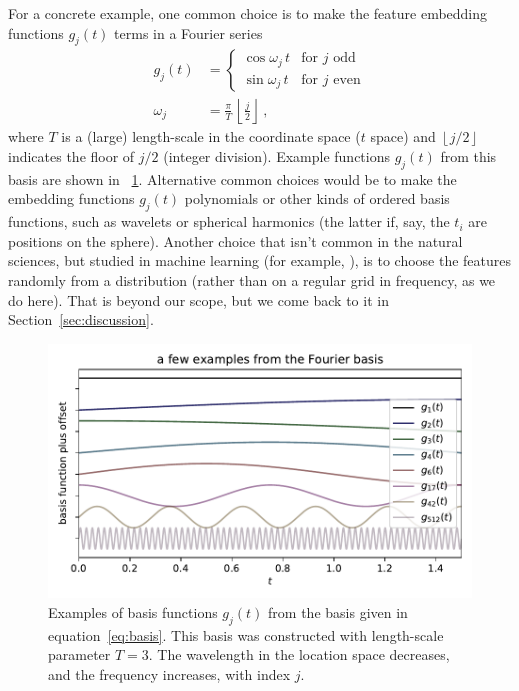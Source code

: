 \documentclass[12pt,letterpaper]{article}
\newlength{\figurewidth}
\newcommand{\floor}[1]{\left\lfloor #1 \right\rfloor}
\newcommand{\sectionname}{Section}
\begin{document}
For a concrete example, one common choice is to make the feature embedding functions $g_j(t)$ terms in a Fourier series
\begin{align}\label{eq:basis}
    g_j(t) &= \left\{\begin{array}{ll}
            \cos\omega_j\,t & \mbox{for $j$ odd} \\
            \sin\omega_j\,t & \mbox{for $j$ even}\end{array}\right.
    \\
    \omega_j &= \frac{\pi}{T}\,\floor{\frac{j}{2}}
    ~,
\end{align}
where $T$ is a (large) length-scale in the coordinate space ($t$ space) and $\floor{j/2}$ indicates the floor of $j/2$ (integer division).
Example functions $g_j(t)$ from this basis are shown in \figurename~\ref{fig:basis}.
Alternative common choices would be to make the embedding functions $g_j(t)$ polynomials or other kinds of ordered basis functions, such as wavelets or spherical harmonics (the latter if, say, the $t_i$ are positions on the sphere).
Another choice that isn't common in the natural sciences, but studied in machine learning (for example, \citealt{rahimi2007random}), is to choose the features randomly from a distribution (rather than on a regular grid in frequency, as we do here). That is beyond our scope, but we come back to it in \sectionname~\ref{sec:discussion}.
\begin{figure}[t]
    \begin{mdframed}
    \includegraphics[width=\figurewidth]{./fourier.pdf}
    \caption{Examples of basis functions $g_j(t)$ from the basis given in equation~\eqref{eq:basis}. This basis was constructed with length-scale parameter $T=3$. The wavelength in the location space decreases, and the frequency increases, with index $j$.}
    \label{fig:basis}
    \end{mdframed}
\end{figure}
\end{document}
